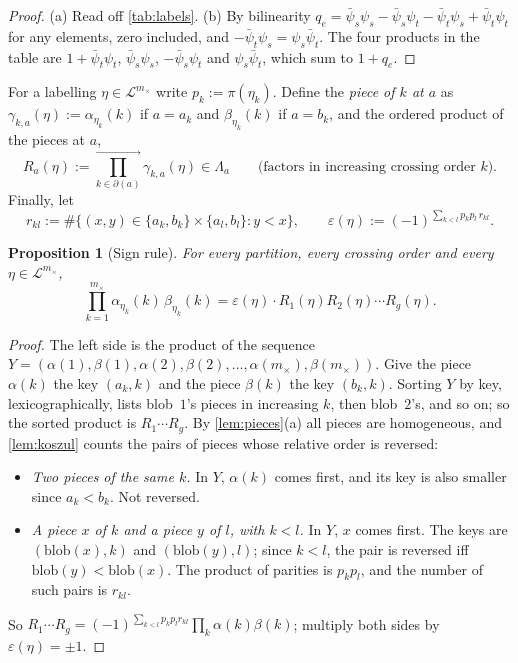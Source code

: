 \documentclass[11pt]{amsart}
\theoremstyle{plain}
\newtheorem{proposition}[theorem]{Proposition}
\theoremstyle{definition}
\theoremstyle{remark}
\numberwithin{equation}{section}
\newcommand{\bpsi}{\bar\psi}
\newcommand{\cL}{\mathcal{L}}
\newcommand{\mx}{m_{\times}}
\begin{document}
\begin{proof}
(a) Read off \cref{tab:labels}. (b) By bilinearity
$q_e=\bpsi_s\psi_s-\bpsi_s\psi_t-\bpsi_t\psi_s+\bpsi_t\psi_t$ for any elements, zero included, and
$-\bpsi_t\psi_s=\psi_s\bpsi_t$. The four products in the table are $1+\bpsi_t\psi_t$,
$\bpsi_s\psi_s$, $-\bpsi_s\psi_t$ and $\psi_s\bpsi_t$, which sum to $1+q_e$.
\end{proof}

For a labelling $\eta\in\cL^{\mx}$ write $p_k:=\pi(\eta_k)$. Define the \emph{piece of $k$ at
$a$} as $\gamma_{k,a}(\eta):=\alpha_{\eta_k}(k)$ if $a=a_k$ and $\beta_{\eta_k}(k)$ if $a=b_k$,
and the ordered product of the pieces at $a$,
\[
  R_a(\eta):=\prod_{k\in\partial(a)}^{\to}\gamma_{k,a}(\eta)\in\Lambda_a
  \qquad\text{(factors in increasing crossing order $k$).}
\]
Finally, let
\[
  r_{kl}:=\#\bigl\{(x,y)\in\{a_k,b_k\}\times\{a_l,b_l\} : y<x\bigr\},\qquad
  \varepsilon(\eta):=(-1)^{\sum_{k<l}p_kp_l\,r_{kl}} .
\]

\begin{proposition}[Sign rule]\label{prop:sign-rule}
For every partition, every crossing order and every $\eta\in\cL^{\mx}$,
\[
  \prod_{k=1}^{\mx}\alpha_{\eta_k}(k)\,\beta_{\eta_k}(k)=\varepsilon(\eta)\cdot R_1(\eta)R_2(\eta)\cdots R_g(\eta).
\]
\end{proposition}

\begin{proof}
The left side is the product of the sequence
$Y=(\alpha(1),\beta(1),\alpha(2),\beta(2),\dots,\alpha(\mx),\beta(\mx))$. Give the piece
$\alpha(k)$ the key $(a_k,k)$ and the piece $\beta(k)$ the key $(b_k,k)$. Sorting $Y$ by key,
lexicographically, lists blob~$1$'s pieces in increasing $k$, then blob~$2$'s, and so on; so the
sorted product is $R_1\cdots R_g$. By \cref{lem:pieces}(a) all pieces are homogeneous, and
\cref{lem:koszul} counts the pairs of pieces whose relative order is reversed:
\begin{itemize}
\item \emph{Two pieces of the same $k$.} In $Y$, $\alpha(k)$ comes first, and its key is also
smaller since $a_k<b_k$. Not reversed.
\item \emph{A piece $x$ of $k$ and a piece $y$ of $l$, with $k<l$.} In $Y$, $x$ comes first. The
keys are $(\mathrm{blob}(x),k)$ and $(\mathrm{blob}(y),l)$; since $k<l$, the pair is reversed iff
$\mathrm{blob}(y)<\mathrm{blob}(x)$. The product of parities is $p_kp_l$, and the number of such
pairs is $r_{kl}$.
\end{itemize}
So $R_1\cdots R_g=(-1)^{\sum_{k<l}p_kp_lr_{kl}}\prod_k\alpha(k)\beta(k)$; multiply both sides by
$\varepsilon(\eta)=\pm1$.
\end{proof}
\end{document}
